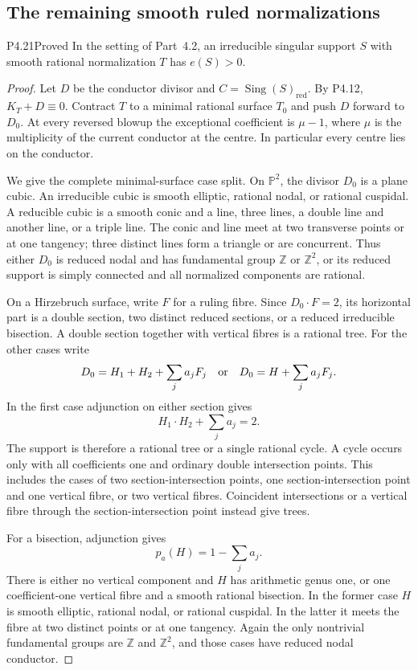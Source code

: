 \subsection{The remaining smooth ruled normalizations}

\begin{statement}{P4.21}{Proved}
In the setting of Part~4.2, an irreducible singular support $S$
with smooth rational normalization $T$ has $e(S)>0$.
\end{statement}
\begin{proof}
Let $D$ be the conductor divisor and
$C=\operatorname{Sing}(S)_{\mathrm{red}}$. By P4.12,
$K_T+D\equiv0$. Contract $T$ to a minimal rational surface
$T_0$ and push $D$ forward to $D_0$. At every reversed
blowup the exceptional coefficient is $\mu-1$, where
$\mu$ is the multiplicity of the current conductor at the
centre. In particular every centre lies on the conductor.

We give the complete minimal-surface case split. On
$\mathbb P^2$, the divisor $D_0$ is a plane cubic. An
irreducible cubic is smooth elliptic, rational nodal, or
rational cuspidal. A reducible cubic is a smooth conic
and a line, three lines, a double line and another line,
or a triple line. The conic and line meet at two
transverse points or at one tangency; three distinct
lines form a triangle or are concurrent. Thus either
$D_0$ is reduced nodal and has fundamental group
$\mathbb Z$ or $\mathbb Z^2$, or its reduced support is
simply connected and all normalized components are
rational.

On a Hirzebruch surface, write $F$ for a ruling fibre.
Since $D_0\cdot F=2$, its horizontal part is a double
section, two distinct reduced sections, or a reduced
irreducible bisection. A double section together with
vertical fibres is a rational tree. For the other cases
write
\[
 D_0=H_1+H_2+\sum_j a_jF_j
 \quad\hbox{or}\quad
 D_0=H+\sum_j a_jF_j.
\]
In the first case adjunction on either section gives
\[
 H_1\cdot H_2+\sum_j a_j=2.
\]
The support is therefore a rational tree or a single
rational cycle. A cycle occurs only with all coefficients
one and ordinary double intersection points. This
includes the cases of two section-intersection points,
one section-intersection point and one vertical fibre,
or two vertical fibres. Coincident intersections or a
vertical fibre through the section-intersection point
instead give trees.

For a bisection, adjunction gives
\[
 p_a(H)=1-\sum_j a_j.
\]
There is either no vertical component and $H$ has
arithmetic genus one, or one coefficient-one vertical
fibre and a smooth rational bisection. In the former
case $H$ is smooth elliptic, rational nodal, or rational
cuspidal. In the latter it meets the fibre at two distinct
points or at one tangency. Again the only nontrivial
fundamental groups are $\mathbb Z$ and $\mathbb Z^2$,
and those cases have reduced nodal conductor.


\end{proof}
